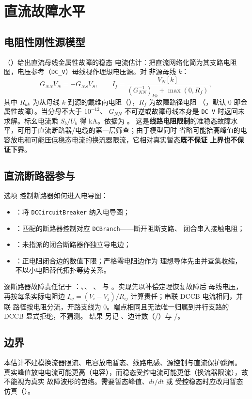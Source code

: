 \section{直流故障水平}\label{sec:sc-dc}

\subsection{电阻性刚性源模型}
（）给出直流母线金属性故障的稳态
电流估计：把直流网络化简为其支路电阻图，电压参考（\texttt{DC\_V}）母线视作理想电压源。对
非源母线 $k$：
\begin{equation}
G_{NN}V_N=-G_{NS}V_S,\qquad
I_f=\frac{V_N[k]}{(G_{NN}^{-1})_{kk}+\max(0,R_f)},
\end{equation}
其中 $R_{kk}$ 为从母线 $k$ 到源的戴维南电阻（），$R_f$ 为故障路径电阻
（，默认 0 即金属性故障）。当分母不大于 $10^{-12}$、
$G_{NN}$ 不可逆或故障母线本身是 \texttt{DC\_V} 时返回未求解。标幺电流乘
$S_b/U_b$ 得 kA。依据为 。
这是\textbf{线路电阻限制}的准稳态故障水平，可用于直流断路器/电缆的第一层筛查；由于模型同时
省略可能抬高峰值的电容放电和可能压低稳态电流的换流器限流，它相对真实暂态\textbf{既不保证
上界也不保证下界}。

\subsection{直流断路器参与}
选项  控制断路器如何进入电导图：
\begin{itemize}
  \item {}：将 \texttt{DCCircuitBreaker} 纳入电导图；
  \item {}：匹配的断路器控制对应 \texttt{DCBranch}——断开阻断支路、
        闭合串入接触电阻；
  \item {}：未指派的闭合断路器作独立导电边；
  \item {}：正电阻闭合边的数值下限；严格零电阻边作为
        理想导体先由并查集收缩，不以小电阻替代拓扑等势关系。
\end{itemize}
逐断路器故障责任记于 ：、、
、 与 。实现先以补偿定理恢复故障后
母线电压，再按每条实际电阻边 $I_{ij}=(V_i-V_j)/R_{ij}$ 计算责任；串联 DCCB 电流相同，并联
路径按电阻分流，开路支线为 0。端点相同且无法唯一归属到并行支路的 DCCB 显式拒绝，不猜测。
结果  另记
、边计数（/）与
/。

\subsection{边界}
本估计\textbf{不}建模换流器限流、电容放电暂态、线路电感、源控制与直流保护跳闸。
真实峰值放电电流可能更高（电容），而稳态受控电流可能更低（换流器限流），故不能视为真实
故障波形的包络。需要暂态峰值、$di/dt$ 或
受控稳态时应改用暂态仿真（）。
